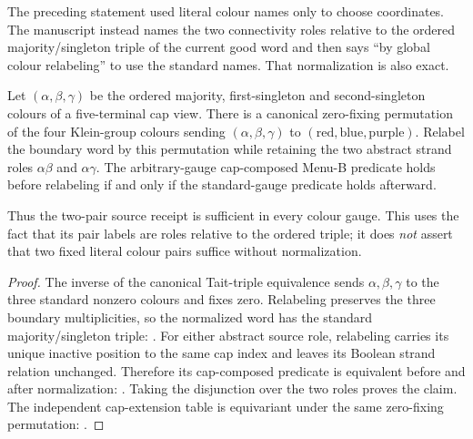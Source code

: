 The preceding statement used literal colour names only to choose coordinates.
The manuscript instead names the two connectivity roles relative to the
ordered majority/singleton triple of the current good word and then says
``by global colour relabeling'' to use the standard names.  That normalization
is also exact.

\begin{proposition}
\label{prop:source-cap-colour-gauge}
Let $(\alpha,\beta,\gamma)$ be the ordered majority, first-singleton and
second-singleton colours of a five-terminal cap view.  There is a canonical
zero-fixing permutation of the four Klein-group colours sending
$(\alpha,\beta,\gamma)$ to
$(\mathrm{red},\mathrm{blue},\mathrm{purple})$.  Relabel the boundary word by
this permutation while retaining the two abstract strand roles
$\alpha\beta$ and $\alpha\gamma$.  The arbitrary-gauge cap-composed Menu-B
predicate holds before relabeling if and only if the standard-gauge predicate
holds afterward.

Thus the two-pair source receipt is sufficient in every colour gauge.  This
uses the fact that its pair labels are roles relative to the ordered triple;
it does \emph{not} assert that two fixed literal colour pairs suffice without
normalization.
\end{proposition}

\begin{proof}
The inverse of the canonical Tait-triple equivalence sends
$\alpha,\beta,\gamma$ to the three standard nonzero colours and fixes zero.
Relabeling preserves the three boundary multiplicities, so the normalized
word has the standard majority/singleton triple:
.
For either abstract source role, relabeling carries its unique inactive
position to the same cap index and leaves its Boolean strand relation
unchanged.  Therefore its cap-composed predicate is equivalent before and
after normalization:
.
Taking the disjunction over the two roles proves the claim.  The independent
cap-extension table is equivariant under the same zero-fixing permutation:
.
\end{proof}

